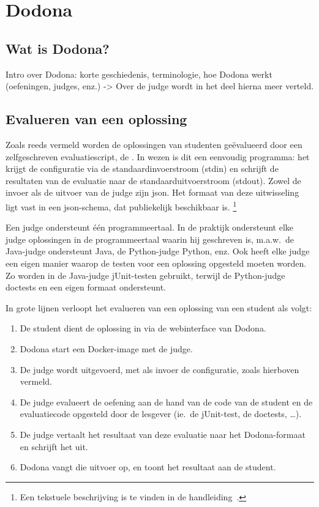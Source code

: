 \chapter{Dodona}\label{ch:dodona}

\section{Wat is Dodona?}\label{sec:wat-is-dodona}

Intro over Dodona: korte geschiedenis, terminologie, hoe Dodona werkt (oefeningen, judges, enz.)
-> Over de judge wordt in het deel hierna meer verteld.

\section{Evalueren van een oplossing}\label{sec:evalueren-van-een-oplossing}

Zoals reeds vermeld worden de oplossingen van studenten geëvalueerd door een zelfgeschreven evaluatiescript, de .
In wezen is dit een eenvoudig programma: het krijgt de configuratie via de standaardinvoerstroom (stdin) en schrijft de resultaten van de evaluatie naar de standaarduitvoerstroom (stdout).
Zowel de invoer als de uitvoer van de judge zijn json.
Het formaat van deze uitwisseling ligt vast in een json-schema, dat publiekelijk beschikbaar is.
\footnote{Een tekstuele beschrijving is te vinden in de handleiding~\autocite{dodona2020}.}

Een judge ondersteunt één programmeertaal.
In de praktijk ondersteunt elke judge oplossingen in de programmeertaal waarin hij geschreven is, m.a.w.\ de Java-judge ondersteunt Java, de Python-judge Python, enz.
Ook heeft elke judge een eigen manier waarop de testen voor een oplossing opgesteld moeten worden.
Zo worden in de Java-judge jUnit-testen gebruikt, terwijl de Python-judge doctests en een eigen formaat ondersteunt.

In grote lijnen verloopt het evalueren van een oplossing van een student als volgt:

\begin{enumerate}
    \item De student dient de oplossing in via de webinterface van Dodona.
    \item Dodona start een Docker-image met de judge.
    \item De judge wordt uitgevoerd, met als invoer de configuratie, zoals hierboven vermeld.
    \item De judge evalueert de oefening aan de hand van de code van de student en de evaluatiecode opgesteld door de lesgever (ie.\ de jUnit-test, de doctests, \ldots).
    \item De judge vertaalt het resultaat van deze evaluatie naar het Dodona-formaat en schrijft het uit.
    \item Dodona vangt die uitvoer op, en toont het resultaat aan de student.
\end{enumerate}

